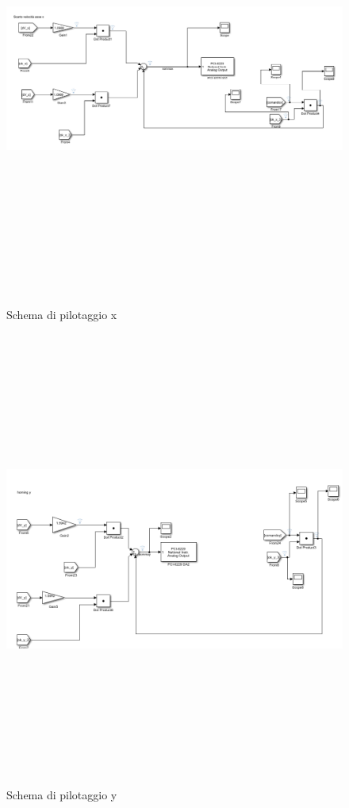 \documentclass{article}
\begin{document}
\begin{figure}[H]
    \centering
    \includegraphics[width=12cm,height=15cm,keepaspectratio]{./stateflow/schemafinx.png}
    \caption{Schema di pilotaggio x}
\end{figure}

\begin{figure}[H]
    \centering
    \includegraphics[width=12cm,height=15cm,keepaspectratio]{./stateflow/schemafiny.png}
    \caption{Schema di pilotaggio y}
\end{figure}
\end{document}

